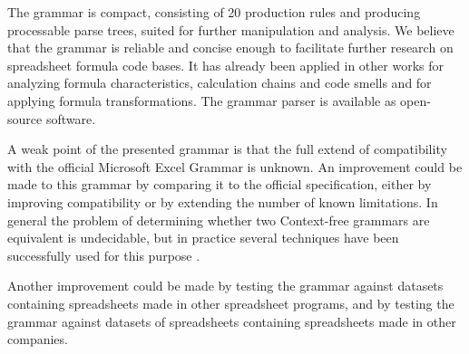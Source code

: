 \documentclass[conference]{IEEEtran}
\begin{document}
The grammar is compact, consisting of 20 production rules and producing processable parse trees, suited for further manipulation and analysis. We believe that the grammar is reliable and concise enough to facilitate further research on spreadsheet formula code bases. It has already been applied in other works for analyzing formula characteristics, calculation chains and code smells and for applying formula transformations. The grammar parser is available as open-source software.

A weak point of the presented grammar is that the full extend of compatibility with the official Microsoft Excel Grammar is unknown.
An improvement could be made to this grammar by comparing it to the official specification, either by improving compatibility or by extending the number of known limitations.
In general the problem of determining whether two Context-free grammars are equivalent is undecidable, but in practice several techniques have been successfully used for this purpose \cite{lammel2009introduction,fischer2012comparison}.

Another improvement could be made by testing the grammar against datasets containing spreadsheets made in other spreadsheet programs, and by testing the grammar against datasets of spreadsheets containing spreadsheets made in other companies.




\end{document}
